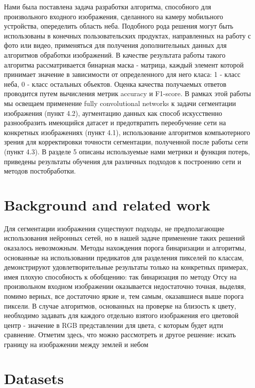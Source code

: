 \documentclass[runningheads]{llncs}
\begin{document}
Нами была поставлена задача разработки алгоритма, способного для произвольного входного
изображения, сделанного на камеру мобильного устройства, опеределить 
область неба. Подобного рода решения могут быть использованы в конечных
пользовательских продуктах, направленных на работу с фото или видео, 
применяться для получения дополнительных данных для алгоритмов 
обработки изображений\cite{ind_outd}.
В качестве результата работы такого алгоритма
рассматривается бинарная маска - матрица, каждый 
элемент которой принимает значение в зависимости от определенного 
для него класа: 1 - класс неба, 0 - класс остальных объектов.
Оценка качества получаемых ответов проводится путем вычисления
метрик accuracy и F1-score. 
В рамках этой работы мы освещаем применение fully convolutional networks к задачи сегментации изображения (пункт 4.2),
аугментацию данных как способ искусственно разнообразить имеющийся датасет и предотвратить переобучение сети на конкретных изображениях (пункт 4.1), использование алгоритмов компьютерного зрения для корректировки точности сегментации, полученной после работы 
сети (пункт 4.3). В разделе 5 описаны используемые нами метрики и функция потерь, приведены результаты обучения для различных подходов к построению сети и методов постобработки.

\section{Background and related work}

Для сегментации изображения существуют подходы, 
не предполагающие использования нейронных сетей\cite{seg1}\cite{seg2}\cite{seg3}, но в нашей 
задаче применение таких решений оказалось невозможным. Методы 
нахождения порога бинаризации и алгоритмы, основанные на
использовании предикатов для разделения пикселей по классам, демонстрируют 
удовлетворительные результаты только на конкретных
примерах, имея плохую способность к обобщению: так бинаризация
по методу Отсу на произвольном входном изображении оказывается
недостаточно точная, выделяя, помимо верных, все достаточно яркие
и, тем самым, оказавшиеся выше порога пиксели. В случае алгоритмов, 
основанных на проверке на близость к цвету, необходимо задавать 
для каждого отдельно взятого изображения его цветовой центр -
значение в RGB представлении для цвета, с которым будет идти сравнение\cite{eff_app}.
Отметим здесь, что можно
рассмотреть и другое решение: искать границу на изображении между 
землей и небом\cite{ef_sky_detect}

\section{Datasets}
\end{document}
